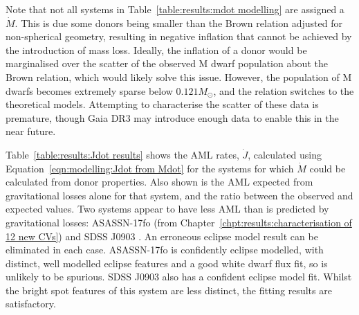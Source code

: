 
Note that not all systems in Table~\ref{table:results:mdot modelling} are assigned a $\dot M$.
This is due some donors being smaller than the Brown relation adjusted for non-spherical geometry, resulting in negative inflation that cannot be achieved by the introduction of mass loss.
Ideally, the inflation of a donor would be marginalised over the scatter of the observed M dwarf population about the Brown relation, which would likely solve this issue.
However, the population of M dwarfs becomes extremely sparse below $0.121 M_\odot$, and the relation switches to the \citet{baraffe2015} theoretical models.
Attempting to characterise the scatter of these data is premature, though Gaia DR3 may introduce enough data to enable this in the near future.

Table~\ref{table:results:Jdot results} shows the AML rates, $\dot J$, calculated using Equation~\ref{eqn:modelling:Jdot from Mdot} for the systems for which $\dot M$ could be calculated from donor properties. Also shown is the AML expected from gravitational losses alone for that system, and the ratio between the observed and expected values.
Two systems appear to have less AML than is predicted by gravitational losses: ASASSN-17fo (from Chapter~\ref{chpt:results:characterisation of 12 new CVs}) and SDSS J0903 \citep{Savoury2011}.
An erroneous eclipse model result can be eliminated in each case. ASASSN-17fo is confidently eclipse modelled, with distinct, well modelled eclipse features and a good white dwarf flux fit, so is unlikely to be spurious. SDSS J0903 also has a confident eclipse model fit. Whilst the bright spot features of this system are less distinct, the fitting results are satisfactory.

